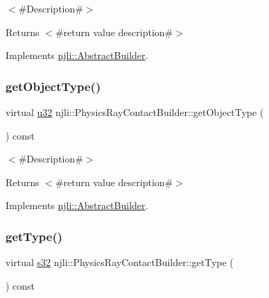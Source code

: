 $<$\#\+Description\#$>$

\begin{DoxyReturn}{Returns}
$<$\#return value description\#$>$ 
\end{DoxyReturn}


Implements \mbox{\hyperlink{classnjli_1_1_abstract_builder_a902f73ea78031b06aca183a417f3413b}{njli\+::\+Abstract\+Builder}}.

\mbox{\label{classnjli_1_1_physics_ray_contact_builder_ae2ebfa550ff3ac2c6cea079947bea034}} 
\subsubsection{\texorpdfstring{get\+Object\+Type()}{getObjectType()}}
{\footnotesize\ttfamily virtual \mbox{\hyperlink{_util_8h_a10e94b422ef0c20dcdec20d31a1f5049}{u32}} njli\+::\+Physics\+Ray\+Contact\+Builder\+::get\+Object\+Type (\begin{DoxyParamCaption}{ }\end{DoxyParamCaption}) const\hspace{0.3cm}{\ttfamily [virtual]}}

$<$\#\+Description\#$>$

\begin{DoxyReturn}{Returns}
$<$\#return value description\#$>$ 
\end{DoxyReturn}


Implements \mbox{\hyperlink{classnjli_1_1_abstract_builder_a0f2d344fcf697b167f4f2b1122b5fb33}{njli\+::\+Abstract\+Builder}}.

\mbox{\label{classnjli_1_1_physics_ray_contact_builder_a67c24309ad6afc528f4b6aa20b7767e7}} 
\subsubsection{\texorpdfstring{get\+Type()}{getType()}}
{\footnotesize\ttfamily virtual \mbox{\hyperlink{_util_8h_aa62c75d314a0d1f37f79c4b73b2292e2}{s32}} njli\+::\+Physics\+Ray\+Contact\+Builder\+::get\+Type (\begin{DoxyParamCaption}{ }\end{DoxyParamCaption}) const\hspace{0.3cm}{\ttfamily [virtual]}}

